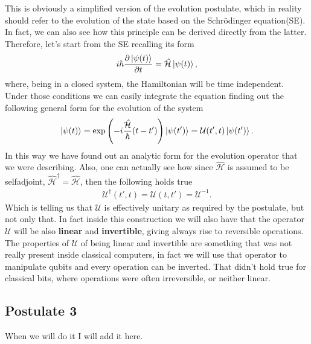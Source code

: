 
\noindent
This is obviously a simplified version of the evolution postulate, which in reality should refer to the evolution of the state based on the Schr\"odinger equation(SE). In fact, we can also see how this principle can be derived directly from the latter. Therefore, let's start from the SE recalling its form
\begin{equation}
    \label{eq:SchEque}
    i\hbar\pdv{\ket{\psi(t)}}{t} = \hat{\mathcal{H}}\ket{\psi(t)},
\end{equation}
where, being in a closed system, the Hamiltonian will be time independent. Under those conditions we can easily integrate the equation finding out the following general form for the evolution of the system
\begin{equation}
    \ket{\psi(t)} = \exp\left( -i\frac{\hat{\mathcal{H}}}{\hbar}(t-t') \right)\ket{\psi(t')} = \mathcal{U}(t', t)\ket{\psi(t')}.
\end{equation}
In this way we have found out an analytic form for the evolution operator that we were describing. Also, one can actually see how since $\hat{\mathcal{H}}$ is assumed to be selfadjoint, $\hat{\mathcal{H}}^\dagger = \hat{\mathcal{H}}$, then the following holds true
\begin{align}
    \mathcal{U}^\dagger(t', t) = \mathcal{U}(t, t') = \mathcal{U}^{-1}.
\end{align}
Which is telling us that $\mathcal{U}$ is effectively unitary as required by the postulate, but not only that. In fact inside this construction we will also have that the operator $\mathcal{U}$ will be also \textbf{linear} and \textbf{invertible}, giving always rise to reversible operations.
\nt
{
    The properties of $\mathcal{U}$ of being linear and invertible are something that was not really present inside classical computers, in fact we will use that operator to manipulate qubits and every operation can be inverted. That didn't hold true for classical bits, where operations were often irreversible, or neither linear.
}

\subsection{Postulate 3}
When we will do it I will add it here.

\newpage